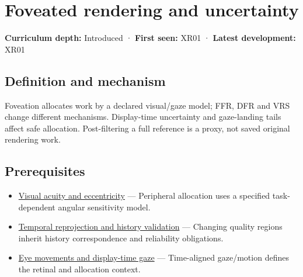 \hypertarget{appendix-5878b813b732}{}\label{referencestart:appendix-5878b813b732}
\section{Foveated rendering and uncertainty}\label{appendix-5878b813b732-foveated-rendering-and-uncertainty}

\hypertarget{appendix-5878b813b732-foveated-rendering-and-uncertainty}{}

\textbf{Curriculum depth:} Introduced · \textbf{First seen:} XR01 · \textbf{Latest development:} XR01

\begin{allmightroledefinition}

\subsection{Definition and mechanism}\label{appendix-5878b813b732-definition-and-mechanism}

\hypertarget{appendix-5878b813b732-definition-and-mechanism}{}

Foveation allocates work by a declared visual/gaze model; FFR, DFR and VRS change different mechanisms. Display-time uncertainty and gaze-landing tails affect safe allocation. Post-filtering a full reference is a proxy, not saved original rendering work.

\end{allmightroledefinition}

\subsection{Prerequisites}\label{appendix-5878b813b732-prerequisites}

\hypertarget{appendix-5878b813b732-prerequisites}{}

\begin{itemize}
\tightlist
\item
  \hyperref[appendix-b491fc48c54b]{Visual acuity and eccentricity} --- Peripheral allocation uses a specified task-dependent angular sensitivity model.
\item
  \hyperref[appendix-0727340a4428]{Temporal reprojection and history validation} --- Changing quality regions inherit history correspondence and reliability obligations.
\item
  \hyperref[appendix-a6f2c4fe1996]{Eye movements and display-time gaze} --- Time-aligned gaze/motion defines the retinal and allocation context.
\end{itemize}

